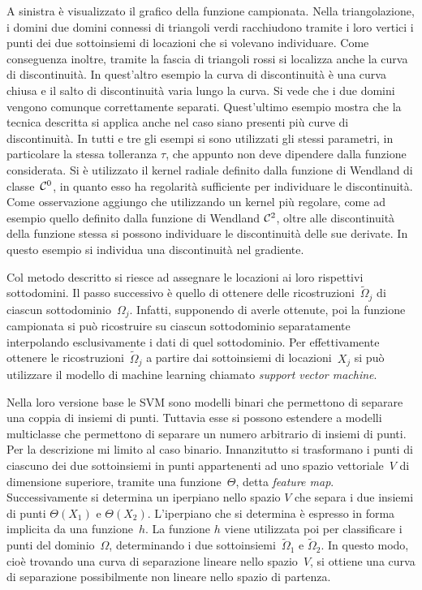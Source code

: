 A sinistra è visualizzato il grafico della funzione campionata.
Nella triangolazione, i domini due domini connessi di triangoli verdi racchiudono tramite i loro vertici i punti dei due sottoinsiemi di locazioni che si volevano individuare.   Come conseguenza inoltre, tramite la fascia di triangoli rossi si localizza anche la curva di discontinuità.\nl
In quest’altro esempio la curva di discontinuità è una curva chiusa e il salto di discontinuità varia lungo la curva.  Si vede che i due domini vengono comunque correttamente separati.\nl 
Quest’ultimo esempio mostra che la tecnica descritta si applica anche nel caso siano presenti più curve di discontinuità.  In tutti e tre gli esempi si sono utilizzati gli stessi parametri, in particolare la stessa tolleranza $\tau$, che appunto non deve dipendere dalla funzione considerata.  Si è utilizzato il kernel radiale definito dalla funzione di Wendland di classe~${\cal C}^0$, in quanto esso ha regolarità sufficiente per individuare le discontinuità.
\nl
Come osservazione aggiungo  che utilizzando un kernel più regolare, come ad esempio quello definito dalla funzione di Wendland ${\cal C}^2$, oltre alle discontinuità della funzione stessa si possono individuare le discontinuità delle sue derivate.  In questo esempio si individua una discontinuità nel gradiente.



Col metodo descritto si riesce ad assegnare le locazioni ai loro rispettivi sottodomini.  Il passo successivo è quello di ottenere delle ricostruzioni~$\tilde\Omega_j$ di ciascun sottodominio~$\Omega_j$.  Infatti, supponendo di averle ottenute, poi la funzione campionata si può ricostruire su ciascun sottodominio separatamente interpolando esclusivamente i dati di quel sottodominio.
Per effettivamente ottenere le ricostruzioni~$\tilde\Omega_j$ a partire dai sottoinsiemi di locazioni~$X_j$ si può utilizzare il modello di machine learning chiamato {\em support vector machine}.



Nella loro versione base le SVM sono modelli binari che permettono di separare una coppia di insiemi di punti.  Tuttavia esse si possono estendere a modelli multiclasse che permettono di separare un numero arbitrario di insiemi di punti.
Per la descrizione mi limito al caso binario.
Innanzitutto si trasformano i punti di ciascuno dei due sottoinsiemi in punti appartenenti ad  uno spazio vettoriale~$V$ di dimensione superiore, tramite una funzione~$\Theta$, detta {\em feature map}.  
 Successivamente si determina un iperpiano nello spazio $V$ che separa i due insiemi di punti $\Theta(X_1)$ e $\Theta(X_2)$. 
L’iperpiano che si determina è espresso in forma implicita da una funzione~$h$.  La funzione $h$ viene utilizzata poi per classificare i punti del dominio~$\Omega$, determinando i due sottoinsiemi~$\tilde\Omega_1$ e $\tilde\Omega_2$.    
In questo modo, cioè trovando una curva di separazione lineare nello spazio~$V$, si ottiene una curva di separazione possibilmente non lineare nello spazio di partenza.


